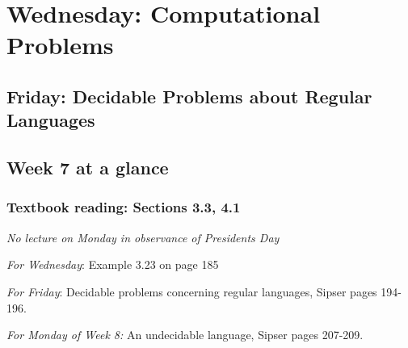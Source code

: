 

\section*{Wednesday: Computational Problems}


    
\newpage
\subsection*{Friday: Decidable Problems about Regular Languages}



\newpage

\subsection*{Week 7 at a glance}

\subsubsection*{Textbook reading: Sections 3.3, 4.1}

{\it No lecture on Monday in observance of Presidents Day}

{\it For Wednesday}: Example 3.23 on page 185

{\it For Friday}:  Decidable problems concerning regular languages, Sipser pages 194-196.

{\it For Monday of Week 8:} An undecidable language, Sipser pages 207-209.

